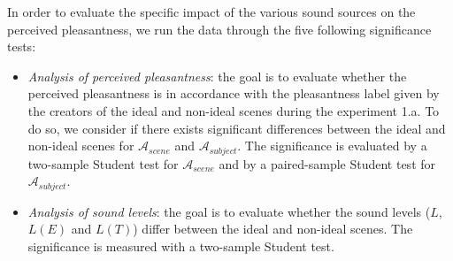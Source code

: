\documentclass[12pt]{elsarticle}
\newcommand{\ie}{\emph{i.\,e.}}
\begin{document}

In order to evaluate the specific impact of the various sound sources on the perceived pleasantness, we run the data through the five following significance tests:

\begin{itemize}



\item \emph{Analysis of perceived pleasantness}: the goal is to evaluate whether the perceived pleasantness is in accordance with the pleasantness label given by the creators of the ideal and non-ideal scenes during the experiment 1.a. To do so, we consider if there exists significant differences between the ideal and non-ideal scenes for $\mathcal{A}_{scene}$ and $\mathcal{A}_{subject}$. The significance is evaluated by a two-sample Student test for $\mathcal{A}_{scene}$ and by a paired-sample Student test for $\mathcal{A}_{subject}$.


\item \emph{Analysis of sound levels}: the goal is to evaluate whether the sound levels ($L$, $L(E)$ and $L(T)$) differ between the ideal and non-ideal scenes. The significance is measured with a two-sample Student test.


\end{itemize}
\end{document}
